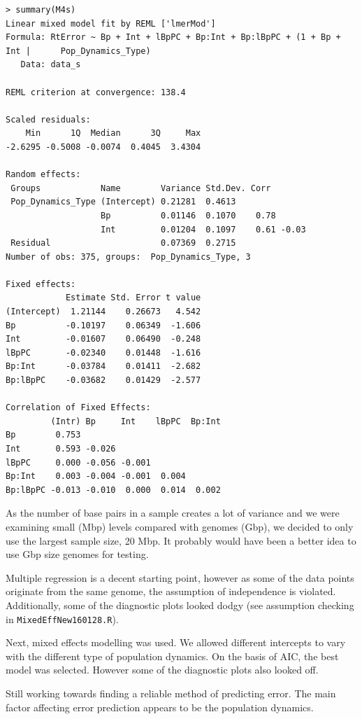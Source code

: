 \documentclass[11pt,a4paper]{article}
\begin{document}
\begin{lstlisting}
> summary(M4s)
Linear mixed model fit by REML ['lmerMod']
Formula: RtError ~ Bp + Int + lBpPC + Bp:Int + Bp:lBpPC + (1 + Bp + Int |      Pop_Dynamics_Type)
   Data: data_s

REML criterion at convergence: 138.4

Scaled residuals: 
    Min      1Q  Median      3Q     Max 
-2.6295 -0.5008 -0.0074  0.4045  3.4304 

Random effects:
 Groups            Name        Variance Std.Dev. Corr       
 Pop_Dynamics_Type (Intercept) 0.21281  0.4613              
                   Bp          0.01146  0.1070    0.78      
                   Int         0.01204  0.1097    0.61 -0.03
 Residual                      0.07369  0.2715              
Number of obs: 375, groups:  Pop_Dynamics_Type, 3

Fixed effects:
            Estimate Std. Error t value
(Intercept)  1.21144    0.26673   4.542
Bp          -0.10197    0.06349  -1.606
Int         -0.01607    0.06490  -0.248
lBpPC       -0.02340    0.01448  -1.616
Bp:Int      -0.03784    0.01411  -2.682
Bp:lBpPC    -0.03682    0.01429  -2.577

Correlation of Fixed Effects:
         (Intr) Bp     Int    lBpPC  Bp:Int
Bp        0.753                            
Int       0.593 -0.026                     
lBpPC     0.000 -0.056 -0.001              
Bp:Int    0.003 -0.004 -0.001  0.004       
Bp:lBpPC -0.013 -0.010  0.000  0.014  0.002
\end{lstlisting}

As the number of base pairs in a sample creates a lot of variance and we were examining small (Mbp) levels compared with genomes (Gbp), we decided to only use the largest sample size, 20 Mbp. It probably would have been a better idea to use Gbp size genomes for testing.

Multiple regression is a decent starting point, however as some of the data points originate from the same genome, the assumption of independence is violated. Additionally, some of the diagnostic plots looked dodgy (see assumption checking in \verb|MixedEffNew160128.R|).

Next, mixed effects modelling was used. We allowed different intercepts to vary with the different type of population dynamics. On the basis of AIC, the best model was selected. However some of the diagnostic plots also looked off.

Still working towards finding a reliable method of predicting error. The main factor affecting error prediction appears to be the population dynamics.
\end{document}
